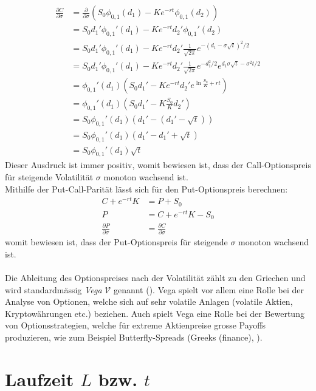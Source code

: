 \documentclass[11pt]{report} %
\newcommand\pd[2]{\displaystyle\frac{\partial #1}{\partial #2}}
\begin{document}
    \begin{align*}
    \pd{C}{\sigma}&=\frac{\partial}{\partial \sigma}\left(S_0\phi_{0, 1}(d_1)-Ke^{-rt}\phi_{0, 1}(d_2)\right)\\
    &=S_0d_1'\phi_{0, 1}'(d_1)-Ke^{-rt}d_2'\phi_{0, 1}'(d_2)\\
    &=S_0d_1'\phi_{0, 1}'(d_1)-Ke^{-rt}d_2'\frac{1}{\sqrt{2\pi}}e^{-(d_1-\sigma\sqrt{t})^2/2}\\
    &=S_0d_1'\phi_{0, 1}'(d_1)-Ke^{-rt}d_2'\frac{1}{\sqrt{2\pi}}e^{-d_1^2/2}e^{d_1\sigma\sqrt{t}-\sigma^2t/2}\\
    &=\phi_{0, 1}'(d_1)\left(S_0d_1'-Ke^{-rt}d_2'e^{\ln{\frac{S_0}{K}}+rt}\right)\\
    &=\phi_{0, 1}'(d_1)\left(S_0d_1'-K\frac{S_0}{K}d_2'\right)\\
    &=S_0\phi_{0, 1}'(d_1)\left(d_1'-(d_1'-\sqrt{t})\right)\\
    &=S_0\phi_{0, 1}'(d_1)\left(d_1'-d_1'+\sqrt{t}\right)\\
    &=S_0\phi_{0, 1}'(d_1)\sqrt{t}
\end{align*}
Dieser Ausdruck ist immer positiv, womit bewiesen ist, dass der Call-Optionspreis für steigende Volatilität $\sigma$ monoton wachsend ist. \\Mithilfe der Put-Call-Parität lässt sich für den Put-Optionspreis berechnen:
    \begin{align*}
        C+e^{-rt}K&=P+S_0\\
        P&=C+e^{-rt}K-S_0\\
        \pd{P}{\sigma}&=\pd{C}{\sigma}
    \end{align*}
    womit bewiesen ist, dass der Put-Optionspreis für steigende $\sigma$ monoton wachsend ist. \\\\Die Ableitung des Optionspreises nach der Volatilität zählt zu den Griechen und wird standardmässig \textit{Vega} $\mathcal{V}$ genannt (\cite{hayes2023}). Vega spielt vor allem eine Rolle bei der Analyse von Optionen, welche sich auf sehr volatile Anlagen (volatile Aktien, Kryptowährungen etc.) beziehen. Auch spielt Vega eine Rolle bei der Bewertung von Optionsstrategien, welche für extreme Aktienpreise grosse Payoffs produzieren, wie zum Beispiel Butterfly-Spreads (Greeks (finance), \cite{wikigreek2024}).

\section{Laufzeit $L$ bzw. $t$}
\end{document}
